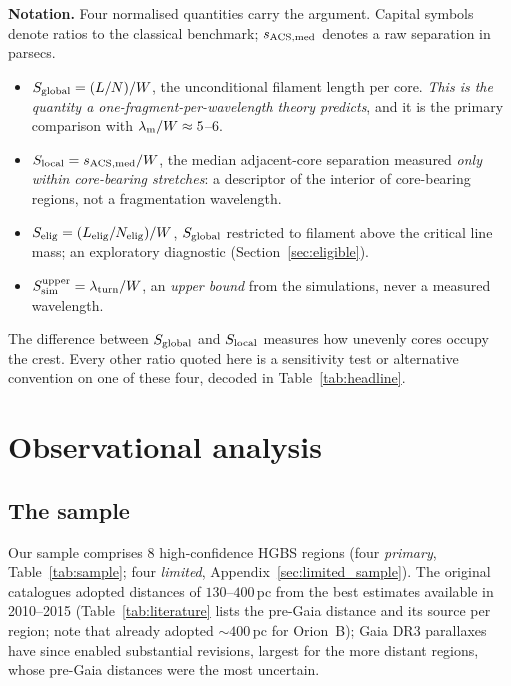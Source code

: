 \documentclass[usenatbib,twoside,twocolumn]{mnras}
\begin{document}
\noindent\textbf{Notation.} Four normalised quantities carry the argument. Capital symbols denote ratios to the classical benchmark; $s_{\rm ACS,med}$ denotes a raw separation in parsecs.
\begin{itemize}\setlength{\itemsep}{1pt}
\item $S_{\rm global}=(L/N)/W$, the unconditional filament length per core. \emph{This is the quantity a one-fragment-per-wavelength theory predicts}, and it is the primary comparison with $\lambda_{\rm m}/W\approx5$--$6$.
\item $S_{\rm local}=s_{\rm ACS,med}/W$, the median adjacent-core separation measured \emph{only within core-bearing stretches}: a descriptor of the interior of core-bearing regions, not a fragmentation wavelength.
\item $S_{\rm elig}=(L_{\rm elig}/N_{\rm elig})/W$, $S_{\rm global}$ restricted to filament above the critical line mass; an exploratory diagnostic (Section~\ref{sec:eligible}).
\item $S_{\rm sim}^{\rm upper}=\lambda_{\rm turn}/W$, an \emph{upper bound} from the simulations, never a measured wavelength.
\end{itemize}
The difference between $S_{\rm global}$ and $S_{\rm local}$ measures how unevenly cores occupy the crest. Every other ratio quoted here is a sensitivity test or alternative convention on one of these four, decoded in Table~\ref{tab:headline}.

\section{Observational analysis}

\subsection{The sample}

Our sample comprises 8 high-confidence HGBS regions (four \emph{primary}, Table~\ref{tab:sample}; four \emph{limited}, Appendix~\ref{sec:limited_sample}). The original catalogues \citep{Konyves2015, Konyves2020, Ladjelate2020, Pezzuto2021} adopted distances of $130$--$400$\,pc from the best estimates available in 2010--2015 (Table~\ref{tab:literature} lists the pre-Gaia distance and its source per region; note that \citealt{Konyves2020} already adopted $\sim400$\,pc for Orion~B); Gaia DR3 parallaxes \citep{Zhang2023} have since enabled substantial revisions, largest for the more distant regions, whose pre-Gaia distances were the most uncertain.
\end{document}
